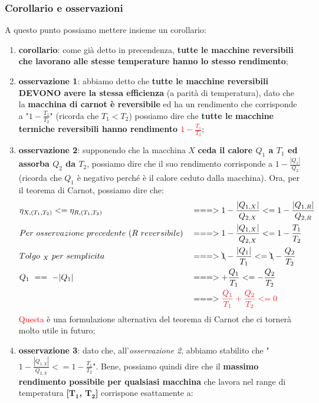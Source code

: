             \subsubsection{Corollario e osservazioni}
                A questo punto possiamo mettere insieme un corollario:
                \begin{enumerate}
                    \item \textbf{corollario}: come già detto in precendenza, \textbf{tutte le macchine reversibili che lavorano alle stesse temperature hanno lo stesso rendimento};
                    \item \textbf{osservazione 1}: abbiamo detto che \textbf{tutte le macchine reversibili DEVONO avere la stessa efficienza} (a parità di temperatura), dato che la \textbf{macchina di carnot è reversibile} ed ha un rendimento che corrisponde a "$1-\frac{T_1}{T_2}$" (ricorda che $T_1<T_2$) possiamo dire che \textbf{tutte le macchine termiche reversibili hanno rendimento \textcolor{Red}{$1-\frac{T_1}{T_2}$}};
                    \item \textbf{osservazione 2}: supponendo che la macchina $X$ \textbf{ceda il calore $Q_1$ a $T_1$ ed assorba $Q_2$ da $T_2$}, possiamo dire che il suo rendimento corrisponde a $1-\frac{|Q_1|}{Q_2}$ (ricorda che $Q_1$ è negativo perché è il calore ceduto dalla macchina). Ora, per il teorema di Carnot, possiamo dire che:
                    \begin{align*}
                        &\eta_{X, (T_1, T_2)} <= \eta_{R, (T_1, T_2)}&&===>1-\frac{|Q_{1, X}|}{Q_{2, X}} <= 1-\frac{|Q_{1, R}|}{Q_{2, R}}\\
                        & Per\ osservazione\ precedente\ (R\ reversibile) &&===>1-\frac{|Q_{1, X}|}{Q_{2, X}} <= 1-\frac{T_1}{T_2}\\
                        & Tolgo\ _X\ per\ semplicita && ===>\bcancel{1}-\frac{|Q_1|}{T_1} <= \bcancel{1}-\frac{Q_2}{T_2}\\
                        & Q_1\ ==\ -|Q_1|&& ===>+\frac{Q_1}{T_1} <= -\frac{Q_2}{T_2}\\
                        & && ===>\textcolor{Red}{\frac{Q_1}{T_1}+ \frac{Q_2}{T_2} <= 0}\\
                    \end{align*}
                    \textcolor{Red}{Questa} è una formulazione alternativa del teorema di Carnot che ci tornerà molto utile in futuro;
                    \item \textbf{osservazione 3}: dato che, all'\textit{osservazione 2}, abbiamo stabilito che "$1-\frac{|Q_{1, X}|}{Q_{2, X}} <= 1-\frac{T_1}{T_2}$". Bene, possiamo quindi dire che il \textbf{massimo rendimento possibile per qualsiasi macchina} che lavora nel range di temperatura \textbf{[$\mathbf{T_1}$, $\mathbf{T_2}$]} corrispone esattamente a:

\end{enumerate}
